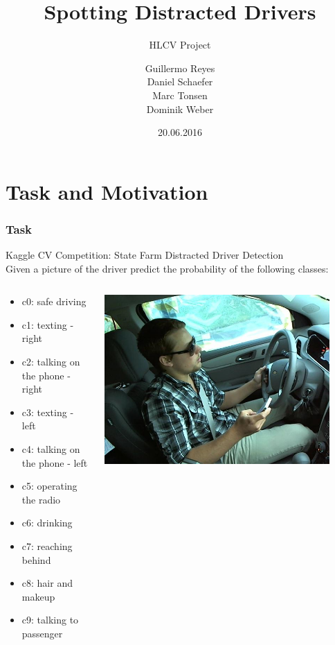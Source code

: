 \documentclass{beamer}
\title{Spotting Distracted Drivers}
\subtitle{HLCV Project}
\author[Reyes, Schaefer, Tonsen, Weber]{Guillermo Reyes \\
	 Daniel Schaefer \\
	 Marc Tonsen \\
 Dominik Weber\\}
\institute[]{Saarland University}
\date{20.06.2016}
\begin{document}
	\begin{frame}
		\titlepage
	\end{frame}
	
	
	\section{Task and Motivation}	
	\begin{frame}
		\frametitle{Task}
		Kaggle CV Competition: State Farm Distracted Driver Detection \\
		Given a picture of the driver predict the probability of the following classes:

		\begin{columns}
			\begin{column}{0.5\textwidth}
				\begin{itemize}
					\item c0: safe driving
					\item c1: texting - right
					\item c2: talking on the phone - right
					\item c3: texting - left
					\item c4: talking on the phone - left
					\item c5: operating the radio
					\item c6: drinking
					\item c7: reaching behind
					\item c8: hair and makeup
					\item c9: talking to passenger			
				\end{itemize}
			\end{column}
			\begin{column}{0.5\textwidth}  %
				\begin{center}
					\includegraphics[width=0.9\textwidth]{img_6}
				\end{center}
			\end{column}
		\end{columns}
		
	\end{frame}
	
\end{document}
